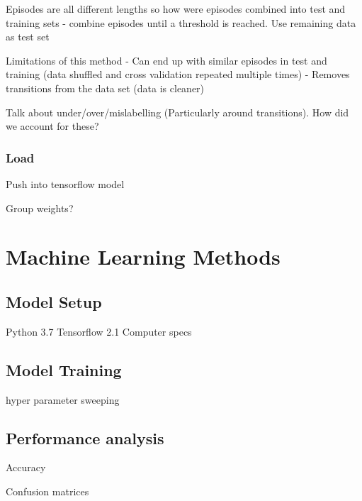 Episodes are all different lengths so how were episodes combined into test and training sets
    - combine episodes until a threshold is reached. Use remaining data as test set

Limitations of this method
 - Can end up with similar episodes in test and training (data shuffled and cross validation repeated multiple times)
 - Removes transitions from the data set (data is cleaner)
 
 Talk about under/over/mislabelling (Particularly around transitions). How did we account for these?

\subsubsection{Load}
Push into tensorflow model

Group weights?

\section{Machine Learning Methods}


\subsection{Model Setup}
Python 3.7
Tensorflow 2.1
Computer specs

\subsection{Model Training}
hyper parameter sweeping

\subsection{Performance analysis}
Accuracy

Confusion matrices

